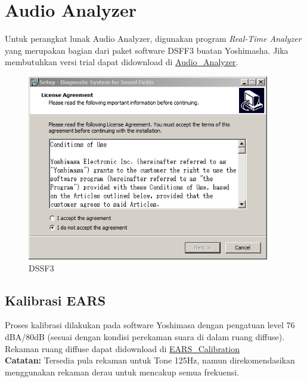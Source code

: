 \documentclass[12pt]{book}
\begin{document}
	\newpage
    \section{Audio Analyzer}

    Untuk perangkat lunak Audio Analyzer, digunakan program \textit{Real-Time Analyzer}
    yang merupakan bagian dari paket software DSFF3 buatan Yoshimasha.
    Jika membutuhkan versi trial dapat didownload di \href{https://drive.google.com/drive/folders/1Z4cc4C_vb7BwU_MHDFyJTTVzQO7n7AHP?usp=share_link}{Audio\_Analyzer}.

    \begin{figure}[!ht]
    	\centering
    	\includegraphics[width=300pt]{images/software/dssf3}
    	\caption{DSSF3}
    \end{figure}

    \subsection{Kalibrasi EARS}

    Proses kalibrasi dilakukan pada software Yoshimasa dengan pengatuan level 76 dBA/80dB (sesuai dengan kondisi perekaman suara di dalam ruang diffuse).
    Rekaman ruang diffuse dapat didownload di \href{https://drive.google.com/drive/folders/1FfFU9WPwoisH7j-oDqF8G0ruZmY0lxM_?usp=share_link}{EARS\_Calibration}\\

    \textbf{Catatan:} Tersedia pula rekaman untuk Tone 125Hz, namun direkomendasikan menggunakan rekaman derau untuk mencakup semua frekuensi.\\
\end{document}
